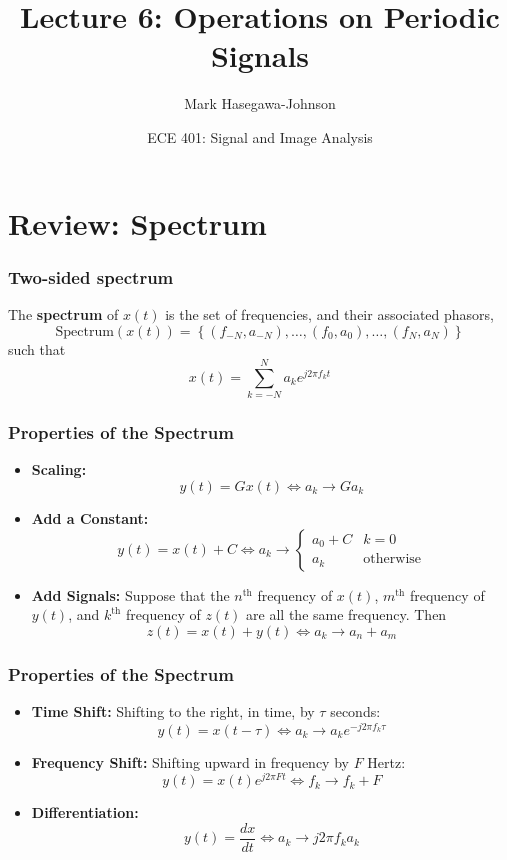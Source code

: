 \documentclass{beamer}
\title{Lecture 6: Operations on Periodic Signals}
\author{Mark Hasegawa-Johnson}
\date{ECE 401: Signal and Image Analysis}
\begin{document}
\begin{frame}
  \maketitle
\end{frame}

\begin{frame}
  \tableofcontents
\end{frame}

\section[Spectrum]{Review: Spectrum}
\setcounter{subsection}{1}

\begin{frame}
  \frametitle{Two-sided spectrum}

  The {\bf spectrum} of $x(t)$ is the set of frequencies, and their
  associated phasors,
  \[
  \mbox{Spectrum}\left( x(t) \right) =
  \left\{ (f_{-N},a_{-N}), \ldots, (f_0,a_0), \ldots, (f_N,a_N) \right\}
  \]
  such that
  \[
  x(t) = \sum_{k=-N}^N a_ke^{j2\pi f_kt}
  \]
\end{frame}

\begin{frame}
  \frametitle{Properties of the Spectrum}
  \begin{itemize}
  \item {\bf Scaling:}
    \[
    y(t) = Gx(t)\Leftrightarrow a_k \rightarrow Ga_k
    \]
  \item {\bf Add a Constant:}
    \[
    y(t)=x(t)+C \Leftrightarrow
    a_k \rightarrow \begin{cases}
      a_0+C & k=0 \\
      a_k & \mbox{otherwise}
    \end{cases}
    \]
  \item {\bf Add Signals:} Suppose that the $n^{\textrm{th}}$ frequency
    of $x(t)$, $m^{\textrm{th}}$ frequency of $y(t)$, and
    $k^{\textrm{th}}$ frequency of $z(t)$ are all the same frequency.  Then 
    \[
    z(t)=x(t)+y(t)
    \Leftrightarrow
    a_k \rightarrow a_n+a_m
    \]
  \end{itemize}
\end{frame}

\begin{frame}
  \frametitle{Properties of the Spectrum}
  \begin{itemize}
  \item {\bf Time Shift:} Shifting to the right, in time, by $\tau$
    seconds:
    \[
    y(t)=x(t-\tau)\Leftrightarrow a_k\rightarrow a_k e^{-j2\pi f_k\tau}
    \]
  \item {\bf Frequency Shift:} Shifting upward in frequency by $F$
    Hertz:
    \[
    y(t)=x(t)e^{j2\pi Ft} \Leftrightarrow f_k\rightarrow f_k+F
    \]
  \item {\bf Differentiation:}
    \[
    y(t) = \frac{dx}{dt} \Leftrightarrow a_k\rightarrow j2\pi f_k a_k
    \]
  \end{itemize}
\end{frame}  
\end{document}
